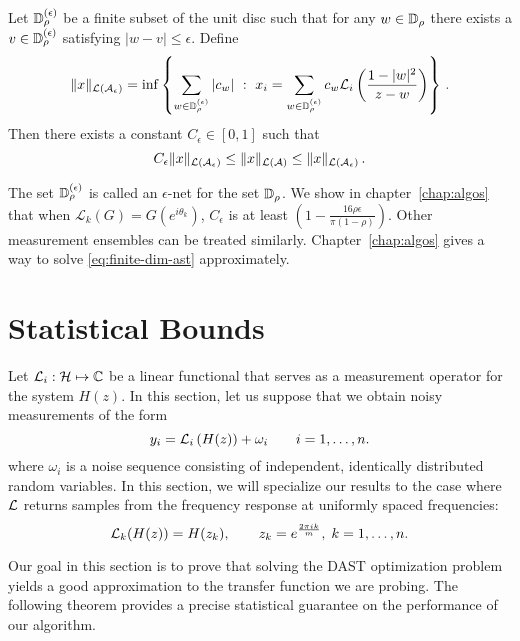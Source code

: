 \begin{prop}\label{prop:grid}
Let $\mathbb{D}_\rho^{(\epsilon)}$ be a finite subset of the unit disc such that for any $w \in \mathbb{D}_\rho$ there exists a $v \in \mathbb{D}_\rho^{(\epsilon)}$ satisfying $|w-v| \leq \epsilon$.  Define
\[
	\|x\|_{\mathcal{L}(\mathcal{A}_\epsilon)} = \inf\left\{ \sum_{w\in \mathbb{D}_{\rho}^{(\epsilon)}} |c_w| ~:~ x_i = \sum_{w\in\mathbb{D}_{\rho}^{(\epsilon)}} c_w\mathcal{L}_i\left(\frac{1-|w|^2}{z-w} \right)\right\}\,.
\]
Then there exists a constant $C_\epsilon \in [0,1]$ such that
\[
	C_\epsilon \|x\|_{\mathcal{L}(\mathcal{A}_{\epsilon})} \leq \|x\|_{\mathcal{L}(\mathcal{A})} \leq \|x\|_{\mathcal{L}(\mathcal{A}_{\epsilon})} \,.
\]
\end{prop}
\noindent The set $\mathbb{D}_\rho^{(\epsilon)}$ is called an $\epsilon$-net for the set
$\mathbb{D}_\rho$. We show in chapter~\ref{chap:algos} that when $\mathcal{L}_k(G) =
G(e^{i\theta_k})$, $C_{\epsilon}$ is at least $(1-\tfrac{16 \rho
\epsilon}{\pi(1-\rho)})$. Other measurement ensembles can be treated similarly.
Chapter~\ref{chap:algos} gives a way to solve \eqref{eq:finite-dim-ast}
approximately.

\section{Statistical Bounds}\label{sec:statistics}
Let $\mathcal{L}_i: \mathcal{H} \mapsto \mathbb{C} $ be a linear functional that serves as a measurement
operator for the system $H(z)$. In this section, let us suppose that we obtain
noisy measurements of the form
$$
y_i=\mathcal{L}_i \left( H(z) \right) +\omega_i \qquad i=1, \ldots, n.
$$
where $\omega_i$ is a noise sequence consisting of independent, identically
distributed random variables. In this section, we will specialize our results to
the case where $\mathcal{L}$ returns samples from the frequency response at uniformly
spaced frequencies:
$$
\mathcal{L}_k(H(z))=H(z_k), \qquad z_k=e^{\frac{2 \pi i k}{m} }, \; k=1, \ldots, n.
$$
%
%

Our goal in this section is to prove that solving the DAST optimization problem
yields a good approximation to the transfer function we are probing. The
following theorem provides a precise statistical guarantee on the performance of
our algorithm.

